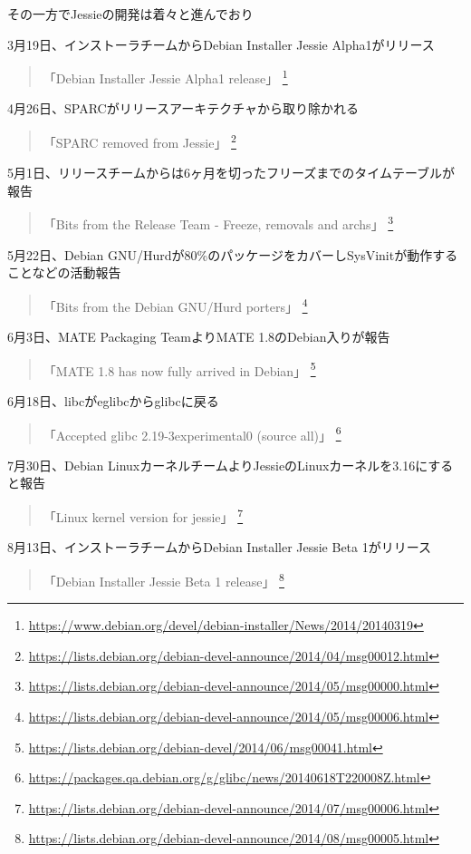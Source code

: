 \documentclass[mingoth,a4paper]{jsarticle}
\begin{document}
その一方でJessieの開発は着々と進んでおり

3月19日、インストーラチームからDebian Installer Jessie Alpha1がリリース
\begin{quote}
  「Debian Installer Jessie Alpha1 release」
  \footnote{\url{https://www.debian.org/devel/debian-installer/News/2014/20140319}}
\end{quote}

4月26日、SPARCがリリースアーキテクチャから取り除かれる
\begin{quote}
  「SPARC removed from Jessie」
  \footnote{\url{https://lists.debian.org/debian-devel-announce/2014/04/msg00012.html}}
\end{quote}

5月1日、リリースチームからは6ヶ月を切ったフリーズまでのタイムテーブルが報告
\begin{quote}
  「Bits from the Release Team - Freeze, removals and archs」
  \footnote{\url{https://lists.debian.org/debian-devel-announce/2014/05/msg00000.html}}
\end{quote}

5月22日、Debian GNU/Hurdが80\%のパッケージをカバーしSysVinitが動作することなどの活動報告
\begin{quote}
  「Bits from the Debian GNU/Hurd porters」
  \footnote{\url{https://lists.debian.org/debian-devel-announce/2014/05/msg00006.html}}
\end{quote}

6月3日、MATE Packaging TeamよりMATE 1.8のDebian入りが報告
\begin{quote}
  「MATE 1.8 has now fully arrived in Debian」
  \footnote{\url{https://lists.debian.org/debian-devel/2014/06/msg00041.html}}
\end{quote}

6月18日、libcがeglibcからglibcに戻る
\begin{quote}
  「Accepted glibc 2.19-3experimental0 (source all)」
  \footnote{\url{https://packages.qa.debian.org/g/glibc/news/20140618T220008Z.html}}
\end{quote}

7月30日、Debian LinuxカーネルチームよりJessieのLinuxカーネルを3.16にすると報告
\begin{quote}
  「Linux kernel version for jessie」
  \footnote{\url{https://lists.debian.org/debian-devel-announce/2014/07/msg00006.html}}
\end{quote}

8月13日、インストーラチームからDebian Installer Jessie Beta 1がリリース
\begin{quote}
  「Debian Installer Jessie Beta 1 release」
  \footnote{\url{https://lists.debian.org/debian-devel-announce/2014/08/msg00005.html}}
\end{quote}
\end{document}
